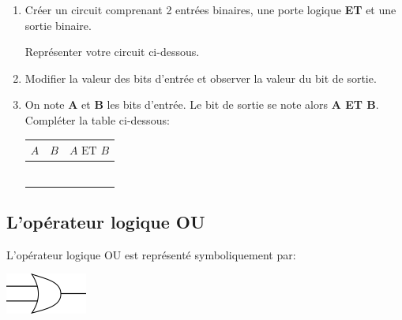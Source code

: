 \documentclass[11pt,a4paper]{article}
\begin{document}
\begin{enumerate}
\item Créer un circuit comprenant 2 entrées binaires, une porte logique \textbf{ET} et une sortie binaire.

Représenter votre circuit ci-dessous.\vspace{2cm}

\item Modifier la valeur des bits d'entrée et observer la valeur du bit de sortie.

\item On note \textbf{A} et \textbf{B} les bits d'entrée. Le bit de sortie se note alors \textbf{A ET B}. Compléter la table ci-dessous:

\begin{center}
\begin{tabular}{*{2}{|C{1cm}}|C{1.6cm}|}\hline
$A$ & $B$ & $A \text{~ET~} B$ \\\hline
 & & \\
 & & \\
 & & \\
  & & \\
 & & \\
 & & \\\hline
\end{tabular}
\end{center}
\end{enumerate}




\subsection*{\Large L'opérateur logique OU }
L'opérateur logique OU est représenté symboliquement par:
\begin{center}
\includegraphics[scale=0.8]{img/operateurOU.png}
\end{center} 
\end{document}
